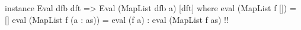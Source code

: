 \begin{code}
instance Eval dfb dft => Eval (MapList dfb a) [dft] where
  eval (MapList f []) = []
  eval (MapList f (a : as)) =
    eval (f a) : eval (MapList f as)  !!
\end{code}
